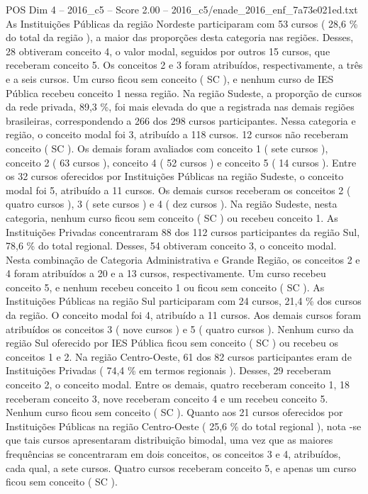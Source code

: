 \begin{textsample}{POS Dim 4 – 2016\_c5 – Score 2.00 – 2016\_c5/enade\_2016\_enf\_7a73e021ed.txt}
As Instituições Públicas da região Nordeste participaram com 53 cursos ( 28,6 \% do total da região ), a maior das proporções desta categoria nas regiões.
Desses, 28 obtiveram conceito 4, o valor modal, seguidos por outros 15 cursos, que receberam conceito 5.
Os conceitos 2 e 3 foram atribuídos, respectivamente, a três e a seis cursos.
Um curso ficou sem conceito ( SC ), e nenhum curso de IES Pública recebeu conceito 1 nessa região.
Na região Sudeste, a proporção de cursos da rede privada, 89,3 \%, foi mais elevada do que a registrada nas demais regiões brasileiras, correspondendo a 266 dos 298 cursos participantes.
Nessa categoria e região, o conceito modal foi 3, atribuído a 118 cursos. 12 cursos não receberam conceito ( SC ).
Os demais foram avaliados com conceito 1 ( sete cursos ), conceito 2 ( 63 cursos ), conceito 4 ( 52 cursos ) e conceito 5 ( 14 cursos ).
Entre os 32 cursos oferecidos por Instituições Públicas na região Sudeste, o conceito modal foi 5, atribuído a 11 cursos.
Os demais cursos receberam os conceitos 2 ( quatro cursos ), 3 ( sete cursos ) e 4 ( dez cursos ).
Na região Sudeste, nesta categoria, nenhum curso ficou sem conceito ( SC ) ou recebeu conceito 1.
As Instituições Privadas concentraram 88 dos 112 cursos participantes da região Sul, 78,6 \% do total regional.
Desses, 54 obtiveram conceito 3, o conceito modal.
Nesta combinação de Categoria Administrativa e Grande Região, os conceitos 2 e 4 foram atribuídos a 20 e a 13 cursos, respectivamente.
Um curso recebeu conceito 5, e nenhum recebeu conceito 1 ou ficou sem conceito ( SC ).
As Instituições Públicas na região Sul participaram com 24 cursos, 21,4 \% dos cursos da região.
O conceito modal foi 4, atribuído a 11 cursos.
Aos demais cursos foram atribuídos os conceitos 3 ( nove cursos ) e 5 ( quatro cursos ).
Nenhum curso da região Sul oferecido por IES Pública ficou sem conceito ( SC ) ou recebeu os conceitos 1 e 2.
Na região Centro-Oeste, 61 dos 82 cursos participantes eram de Instituições Privadas ( 74,4 \% em termos regionais ).
Desses, 29 receberam conceito 2, o conceito modal.
Entre os demais, quatro receberam conceito 1, 18 receberam conceito 3, nove receberam conceito 4 e um recebeu conceito 5.
Nenhum curso ficou sem conceito ( SC ).
Quanto aos 21 cursos oferecidos por Instituições Públicas na região Centro-Oeste ( 25,6 \% do total regional ), nota -se que tais cursos apresentaram distribuição bimodal, uma vez que as maiores frequências se concentraram em dois conceitos, os conceitos 3 e 4, atribuídos, cada qual, a sete cursos.
Quatro cursos receberam conceito 5, e apenas um curso ficou sem conceito ( SC ).

\end{textsample}
